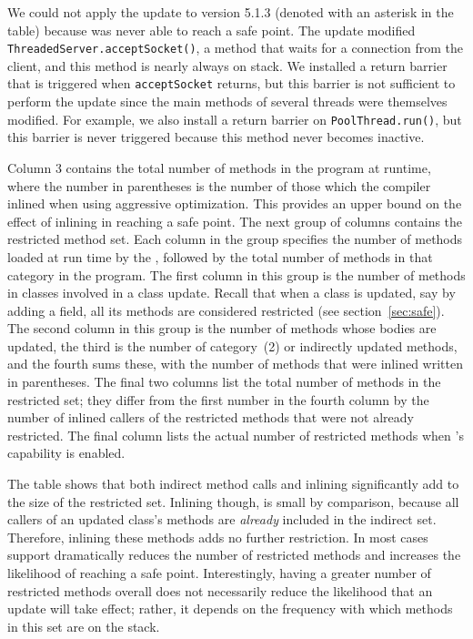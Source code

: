 We could not apply the update to version 5.1.3 (denoted with an asterisk in
the table) because \JV was never able to reach a safe point. The update
modified {\tt ThreadedServer.acceptSocket()}, a method that waits for a
connection from the client, and this method is nearly always on stack.  We
installed a return barrier that is triggered when {\tt acceptSocket}
returns, but this barrier is not sufficient to perform the update since the
main methods of several threads were themselves modified. For example, we
also install a return barrier on {\tt PoolThread.run()}, but this barrier
is never triggered because this method never becomes inactive.

Column 3 contains the total number of methods in the program at runtime,
where the number in parentheses is the number of those which the compiler
inlined when using aggressive optimization.  This provides an upper bound
on the effect of inlining in reaching a safe point.  The next group of
columns contains the restricted method set. Each column in the group
specifies the number of methods loaded at run time by the \VM, followed by
the total number of methods in that category in the program. The first
column in this group is the number of methods in classes involved in a
class update. Recall that when a class is updated, say by adding a field,
all its methods are considered restricted (see section~\ref{sec:safe}).  The
second column in this group is the number of methods whose bodies are
updated, the third is the number of category~(2) or indirectly updated
methods, and the
fourth sums these, with the number of methods that were inlined written in
parentheses. The final two columns list the total number of methods in the
restricted set; they differ from the first number in the fourth column by
the number of inlined callers of the restricted methods that were not
already restricted.  The final column lists the actual number of restricted
methods when \JV's \OSR capability is enabled.

The table shows that both indirect method calls and inlining significantly
add to the size of the restricted set.  Inlining though, is small by
comparison, because all callers of an updated class's methods are
\emph{already} included in the indirect set. Therefore, inlining these
methods adds no further restriction.  In most cases \OSR support
dramatically reduces the number of restricted methods and increases the
likelihood of reaching a \USD safe point.  Interestingly, having a greater
number of restricted methods overall does not necessarily reduce the
likelihood that an update will take effect; rather, it depends on the
frequency with which methods in this set are on the stack.

